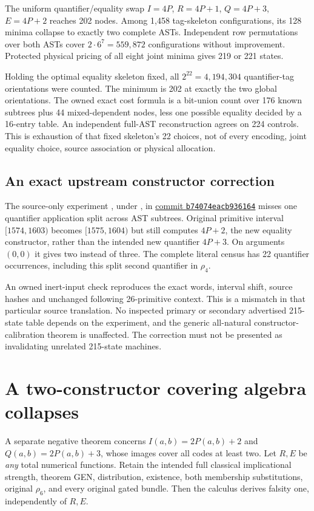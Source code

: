 \documentclass[11pt]{article}
\newcommand{\file}[1]{{\small\path{#1}}}
\begin{document}
The uniform quantifier/equality swap $I=4P$, $R=4P+1$, $Q=4P+3$, $E=4P+2$ reaches 202 nodes. Among 1,458 tag-skeleton configurations, its 128 minima collapse to exactly two complete ASTs. Independent row permutations over both ASTs cover $2\cdot6^7=559,872$ configurations without improvement. Protected physical pricing of all eight joint minima gives 219 or 221 states.

Holding the optimal equality skeleton fixed, all $2^{22}=4,194,304$ quantifier-tag orientations were counted. The minimum is 202 at exactly the two global orientations. The owned exact cost formula is a bit-union count over 176 known subtrees plus 44 mixed-dependent nodes, less one possible equality decided by a 16-entry table. An independent full-AST reconstruction agrees on 224 controls. This is exhaustion of that fixed skeleton's 22 choices, not of every encoding, joint equality choice, source association or physical allocation.

\subsection*{An exact upstream constructor correction}
The source-only experiment \file{swap_Q_E.json}, under \file{data/constructor-variants/}, in \href{https://github.com/VladimirReshetnikov/ProveIt/commit/b74074eacb936164d85e0f1aea5a8254412ade48}{commit \texttt{b74074eacb936164}} misses one quantifier application split across AST subtrees. Original primitive interval $[1574,1603)$ becomes $[1575,1604)$ but still computes $4P+2$, the new equality constructor, rather than the intended new quantifier $4P+3$. On arguments $(0,0)$ it gives two instead of three. The complete literal census has 22 quantifier occurrences, including this split second quantifier in $\rho_4$.

An owned inert-input check reproduces the exact words, interval shift, source hashes and unchanged following 26-primitive context. This is a mismatch in that particular source translation. No inspected primary or secondary advertised 215-state table depends on the experiment, and the generic all-natural constructor-calibration theorem is unaffected. The correction must not be presented as invalidating unrelated 215-state machines.

\section{A two-constructor covering algebra collapses}
A separate negative theorem concerns $I(a,b)=2P(a,b)+2$ and $Q(a,b)=2P(a,b)+3$, whose images cover all codes at least two. Let $R,E$ be \emph{any} total numerical functions. Retain the intended full classical implicational strength, theorem GEN, distribution, existence, both membership substitutions, original $\rho_6$, and every original gated bundle. Then the calculus derives falsity one, independently of $R,E$.
\end{document}
